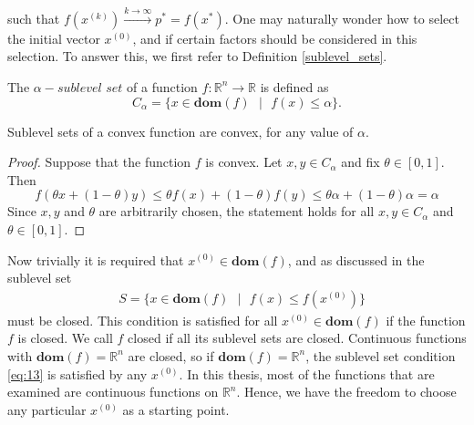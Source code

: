 such that $f(x^{(k)}) \xrightarrow{k\rightarrow\infty} p^{*}=f(x^{*}).$ One may naturally wonder how to select the initial vector $x^{(0)}$, and if certain factors should be considered in this selection. To answer this, we first refer to Definition \ref{sublevel_sets}.
\begin{definition}\label{sublevel_sets}
\cite[75]{boyd2004convex}  
The $\alpha-\textit{sublevel set}$ of a function $f: \mathbb{R}^{n} \longrightarrow \mathbb{R}$ is defined as $$C_{\alpha} = \{x \in \textbf{dom} (f) \text{ }|\text{ } f(x) \leq \alpha\}.$$
\end{definition}
\begin{remark}
\cite[75]{boyd2004convex}  
Sublevel sets of a convex function are convex, for any value of $\alpha$.
\end{remark}
\begin{proof}
Suppose that the function $f$ is convex. Let $x,y \in C_{\alpha}$ and fix $\theta \in [0,1]$. Then $$f(\theta x + (1-\theta)y) \leq \theta f(x) + (1-\theta)f(y) \leq \theta \alpha + (1-\theta)\alpha = \alpha$$
Since $x,y$ and $\theta$ are arbitrarily chosen, the statement holds for all $x,y \in C_{\alpha}$ and $\theta \in [0,1]$.
\end{proof} 
Now trivially it is required that $x^{(0)} \in \textbf{dom} (f)$, and as discussed in \cite[457]{boyd2004convex} the sublevel set 
\begin{equation*}\label{eq:13}\tag{3.3.3}
\begin{aligned}
    &S = \{x \in \textbf{dom} (f) \text{ }|\text{ } f(x) \leq f(x^{(0)})\}
\end{aligned}
\end{equation*}
must be closed. This condition is satisfied for all $x^{(0)} \in \textbf{dom} (f)$ if the function $f$ is closed. We call $f$ closed if all its sublevel sets are closed. Continuous functions with $\textbf{dom} (f) = \mathbb{R}^{n}$ are closed, so if $\textbf{dom} (f) = \mathbb{R}^{n}$, the sublevel set condition \eqref{eq:13} is satisfied by any $x^{(0)}$. In this thesis, most of the functions that are examined are continuous functions on $\mathbb{R}^{n}.$ Hence, we have the freedom to choose any particular $x^{(0)}$ as a starting point. 

